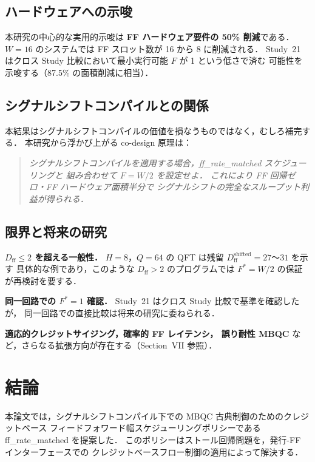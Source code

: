\documentclass[journal,10pt,twocolumn]{IEEEtran}
\begin{document}
\subsection{ハードウェアへの示唆}

本研究の中心的な実用的示唆は \textbf{FF ハードウェア要件の 50\% 削減}である．
$W = 16$ のシステムでは FF スロット数が 16 から 8 に削減される．
Study~21 はクロス Study 比較において最小実行可能 $F$ が 1 という低さで済む
可能性を示唆する（87.5\% の面積削減に相当）．

\subsection{シグナルシフトコンパイルとの関係}

本結果はシグナルシフトコンパイルの価値を損なうものではなく，むしろ補完する．
本研究から浮かび上がる co-design 原理は：

\begin{quote}
\textit{シグナルシフトコンパイルを適用する場合，ff\_rate\_matched スケジューリングと
組み合わせて $F = W/2$ を設定せよ．
これにより FF 回帰ゼロ・FF ハードウェア面積半分で
シグナルシフトの完全なスループット利益が得られる．}
\end{quote}

\subsection{限界と将来の研究}

\textbf{$D_{\mathrm{ff}} \leq 2$ を超える一般性．}
$H=8$，$Q=64$ の QFT は残留 $D_{\mathrm{ff}}^{\mathrm{shifted}} = 27$〜$31$ を示す
具体的な例であり，このような $D_{\mathrm{ff}} > 2$ のプログラムでは
$F^* = W/2$ の保証が再検討を要する．

\textbf{同一回路での $F^*=1$ 確認．}
Study~21 はクロス Study 比較で基準を確認したが，
同一回路での直接比較は将来の研究に委ねられる．

\textbf{適応的クレジットサイジング，確率的 FF レイテンシ，
誤り耐性 MBQC} など，さらなる拡張方向が存在する（Section~VII 参照）．

\section{結論}

本論文では，シグナルシフトコンパイル下での MBQC 古典制御のためのクレジットベース
フィードフォワード幅スケジューリングポリシーである ff\_rate\_matched を提案した．
このポリシーはストール回帰問題を，発行-FF インターフェースでの
クレジットベースフロー制御の適用によって解決する．
\end{document}
